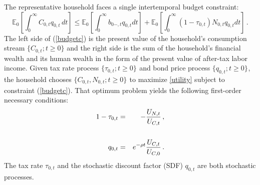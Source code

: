 \documentclass[12pt]{article}
\begin{document}
The representative household faces a single intertemporal  budget constraint: 
\begin{equation}\label{budgetc}
	\mathbb{E}_0 \left[ \int_{0}^{\infty}  C_{0, t} q_{0, t}  \, dt \right]\leq \mathbb{E}_0 \left[ \int_{0}^{\infty} {b_{0-, t} q_{0, t}} dt \right] + \mathbb{E}_0\left[ \int_{0}^{\infty}  (1-\tau_{0, t})N_{0, t} q_{0, t} dt \right] \, . 
\end{equation}
The left side of (\ref{budgetc}) is the present value of  the household's consumption stream $\{ C_{0,t};  t\geq 0\}$ and the right side is the  sum of the household's financial wealth and its human wealth in the form of the present value of  after-tax labor income.
Given  tax rate process   $\{\tau_{0, t}; t\geq 0\}_{}$ and  bond price process $\{ q_{0, t}; t\geq 0\}_{}$, the household chooses $\{C_{0, t}, N_{0, t}; t\geq 0\}_{}$ to maximize \eqref{utility} subject to constraint (\ref{budgetc}).
That optimum problem yields
the following 
first-order necessary  conditions: 
\begin{eqnarray}
	1-\tau_{0, t}& = & -\frac{U_{N, t}}{U_{C, t}}  \, ,  \label{foch1} \\ && \notag \\
	q_{0,t} & = & %
	e^{-\rho t}\frac{U_{C, t}}{U_{C, 0}}  \label{foch2}\, . 
\end{eqnarray}
The tax rate $\tau_{0, t}$ and  the stochastic discount factor (SDF)  $q_{0,t}$ are both stochastic processes.  
\end{document}
